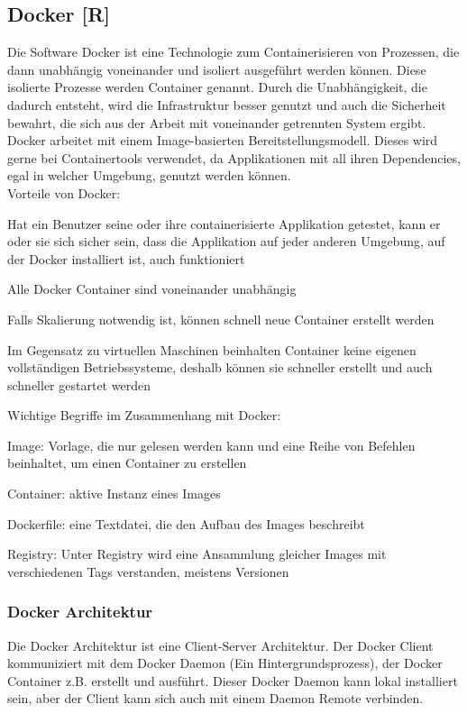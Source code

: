 \subsection{Docker [R]} \label{tech:docker}
Die Software Docker ist eine Technologie zum Containerisieren von Prozessen, die dann unabhängig voneinander und isoliert ausgeführt werden können. Diese isolierte Prozesse werden Container genannt.
Durch die Unabhängigkeit, die dadurch entsteht, wird die Infrastruktur besser genutzt und auch die Sicherheit bewahrt, die sich aus der Arbeit mit voneinander getrennten System ergibt.
Docker arbeitet mit einem Image-basierten Bereitstellungsmodell. Dieses wird gerne bei Containertools verwendet, da Applikationen mit all ihren Dependencies, egal in welcher Umgebung, genutzt werden können. \cite{docker} \\
Vorteile von Docker: \cite{docker_vorteile}
\begin{compactitem}
    \item Hat ein Benutzer seine oder ihre containerisierte Applikation getestet, kann er oder sie sich sicher sein, dass die Applikation auf jeder anderen Umgebung, auf der Docker installiert ist, auch funktioniert
    \item Alle Docker Container sind voneinander unabhängig
    \item Falls Skalierung notwendig ist, können schnell neue Container erstellt werden
    \item Im Gegensatz zu virtuellen Maschinen beinhalten Container keine eigenen vollständigen Betriebssysteme, deshalb können sie schneller erstellt und auch schneller gestartet werden
\end{compactitem}

Wichtige Begriffe im Zusammenhang mit Docker:

\begin{compactitem}
    \item Image: Vorlage, die nur gelesen werden kann und eine Reihe von Befehlen beinhaltet, um einen Container zu erstellen
    \item Container: aktive Instanz eines Images
    \item Dockerfile: eine Textdatei, die den Aufbau des Images beschreibt
    \item Registry: Unter Registry wird eine Ansammlung gleicher Images mit verschiedenen Tags verstanden, meistens Versionen
\end{compactitem}

\subsubsection{Docker Architektur}
Die Docker Architektur ist eine Client-Server Architektur. Der Docker Client kommuniziert mit dem Docker Daemon (Ein Hintergrundsprozess), der Docker Container z.B. erstellt und ausführt.
Dieser Docker Daemon kann lokal installiert sein, aber der Client kann sich auch mit einem Daemon Remote verbinden. \cite{docker_architektur}

